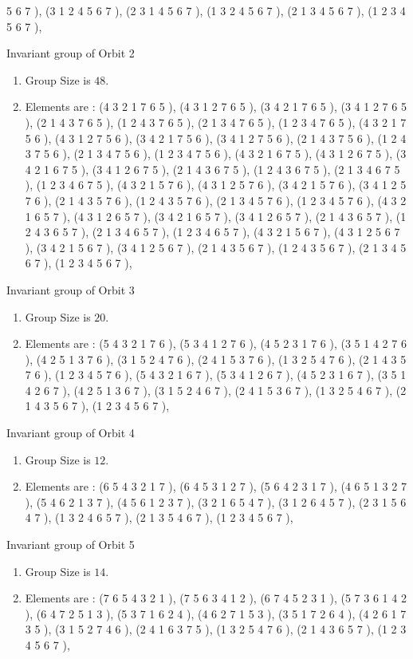 \documentclass[12pt]{article}
\begin{document}
\begin{enumerate}
5 6 7  ), (3 1 2 4 5 6 7  ), (2 3 1 4 5 6 7  ), (1 3 2 4 5 6 7  ), (2 1 3 4 5 6 7  ), (1 2 3 4 5 6 7  ), 
\end{enumerate}
Invariant group of Orbit 2
\begin{enumerate}
\item Group Size is $48$.
\item Elements are : (4 3 2 1 7 6 5  ), (4 3 1 2 7 6 5  ), (3 4 2 1 7 6 5  ), (3 4 1 2 7 6 5  ), (2 1 4 3 7 6 5  ), (1 2 4 3 7 6 5  ), (2 1 3 4 7 6 5  ), (1 2 3 4 7 6 5  ), (4 3 2 1 7 5 6  ), (4 3 1 2 7 5 6  ), (3 4 2 1 7 5 6  ), (3 4 1 2 7 5 6  ), (2 1 4 3 7 5 6  ), (1 2 4 3 7 5 6  ), (2 1 3 4 7 5 6  ), (1 2 3 4 7 5 6  ), (4 3 2 1 6 7 5  ), (4 3 1 2 6 7 5  ), (3 4 2 1 6 7 5  ), (3 4 1 2 6 7 5  ), (2 1 4 3 6 7 5  ), (1 2 4 3 6 7 5  ), (2 1 3 4 6 7 5  ), (1 2 3 4 6 7 5  ), (4 3 2 1 5 7 6  ), (4 3 1 2 5 7 6  ), (3 4 2 1 5 7 6  ), (3 4 1 2 5 7 6  ), (2 1 4 3 5 7 6  ), (1 2 4 3 5 7 6  ), (2 1 3 4 5 7 6  ), (1 2 3 4 5 7 6  ), (4 3 2 1 6 5 7  ), (4 3 1 2 6 5 7  ), (3 4 2 1 6 5 7  ), (3 4 1 2 6 5 7  ), (2 1 4 3 6 5 7  ), (1 2 4 3 6 5 7  ), (2 1 3 4 6 5 7  ), (1 2 3 4 6 5 7  ), (4 3 2 1 5 6 7  ), (4 3 1 2 5 6 7  ), (3 4 2 1 5 6 7  ), (3 4 1 2 5 6 7  ), (2 1 4 3 5 6 7  ), (1 2 4 3 5 6 7  ), (2 1 3 4 5 6 7  ), (1 2 3 4 5 6 7  ), 
\end{enumerate}
Invariant group of Orbit 3
\begin{enumerate}
\item Group Size is $20$.
\item Elements are : (5 4 3 2 1 7 6  ), (5 3 4 1 2 7 6  ), (4 5 2 3 1 7 6  ), (3 5 1 4 2 7 6  ), (4 2 5 1 3 7 6  ), (3 1 5 2 4 7 6  ), (2 4 1 5 3 7 6  ), (1 3 2 5 4 7 6  ), (2 1 4 3 5 7 6  ), (1 2 3 4 5 7 6  ), (5 4 3 2 1 6 7  ), (5 3 4 1 2 6 7  ), (4 5 2 3 1 6 7  ), (3 5 1 4 2 6 7  ), (4 2 5 1 3 6 7  ), (3 1 5 2 4 6 7  ), (2 4 1 5 3 6 7  ), (1 3 2 5 4 6 7  ), (2 1 4 3 5 6 7  ), (1 2 3 4 5 6 7  ), 
\end{enumerate}
Invariant group of Orbit 4
\begin{enumerate}
\item Group Size is $12$.
\item Elements are : (6 5 4 3 2 1 7  ), (6 4 5 3 1 2 7  ), (5 6 4 2 3 1 7  ), (4 6 5 1 3 2 7  ), (5 4 6 2 1 3 7  ), (4 5 6 1 2 3 7  ), (3 2 1 6 5 4 7  ), (3 1 2 6 4 5 7  ), (2 3 1 5 6 4 7  ), (1 3 2 4 6 5 7  ), (2 1 3 5 4 6 7  ), (1 2 3 4 5 6 7  ), 
\end{enumerate}
Invariant group of Orbit 5
\begin{enumerate}
\item Group Size is $14$.
\item Elements are : (7 6 5 4 3 2 1  ), (7 5 6 3 4 1 2  ), (6 7 4 5 2 3 1  ), (5 7 3 6 1 4 2  ), (6 4 7 2 5 1 3  ), (5 3 7 1 6 2 4  ), (4 6 2 7 1 5 3  ), (3 5 1 7 2 6 4  ), (4 2 6 1 7 3 5  ), (3 1 5 2 7 4 6  ), (2 4 1 6 3 7 5  ), (1 3 2 5 4 7 6  ), (2 1 4 3 6 5 7  ), (1 2 3 4 5 6 7  ), 
\end{enumerate}
\end{document}
